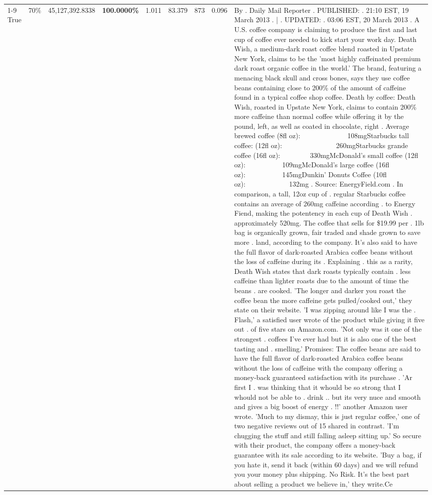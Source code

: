 \begin{table}[H]
{\begin{tabular}{lllrlllll}
\cline{1-9} \cline{2-9}
True & 70\% & 45,127,392.8338 & \bfseries \color{red} 100.0000\% & 1.011 & 83.379 & 873 & 0.096 & By . Daily Mail Reporter . PUBLISHED: . 21:10 EST, 19 March 2013 . | . UPDATED: . 03:06 EST, 20 March 2013 . A U.S. coffee company is claiming to produce the first and last cup of coffee ever needed to kick start your work day. Death Wish, a medium-dark roast coffee blend roasted in Upstate New York, claims to be the 'most highly caffeinated premium dark roast organic coffee in the world.' The brand, featuring a menacing black skull and cross bones, says they use coffee beans containing close to 200\% of the amount of caffeine found in a typical coffee shop coffee. Death by coffee: Death Wish, roasted in Upstate New York, claims to contain 200\% more caffeine than normal coffee while offering it by the pound, left, as well as coated in chocolate, right . Average brewed coffee (8fl oz):              108mgStarbucks tall coffee: (12fl oz):                260mgStarbucks grande coffee (16fl oz):         330mgMcDonald's small coffee (12fl oz):           109mgMcDonald's large coffee (16fl oz):           145mgDunkin' Donuts Coffee (10fl oz):             132mg . Source: EnergyField.com . In comparison, a tall, 12oz cup of . regular Starbucks coffee contains an average of 260mg caffeine according . to Energy Fiend, making the potentency in each cup of Death Wish . approximately 520mg. The coffee that sells for \$19.99 per . 1lb bag is organically grown, fair traded and shade grown to save more . land, according to the company. It's also said to have the full flavor of dark-roasted Arabica coffee beans without the loss of caffeine during its . Explaining . this as a rarity, Death Wish states that dark roasts typically contain . less caffeine than lighter roasts due to the amount of time the beans . are cooked. 'The longer and darker you roast the coffee bean the more caffeine gets pulled/cooked out,' they state on their website. 'I was zipping around like I was the . Flash,' a satisfied user wrote of the product while giving it five out . of five stars on Amazon.com. 'Not only was it one of the strongest . coffees I've ever had but it is also one of the best tasting and . smelling.’ Promises: The coffee beans are said to have the full flavor of dark-roasted Arabica coffee beans without the loss of caffeine with the company offering a money-back guaranteed satisfaction with its purchase . 'Ar first I . was thinking that it whould be so strong that I whould not be able to . drink .. but its very nuce and smooth and gives a big boost of energy . !!' another Amazon user wrote. 'Much to my dismay, this is just regular coffee,' one of two negative reviews out of 15 shared in contrast. 'I'm chugging the stuff and still falling asleep sitting up.' So secure with their product, the company offers a money-back guarantee with its sale according to its website. 'Buy a bag, if you hate it, send it back (within 60 days) and we will refund you your money plus shipping. No Risk. It’s the best part about selling a product we believe in,' they write.Ce \\

\end{tabular}}
\end{table}
